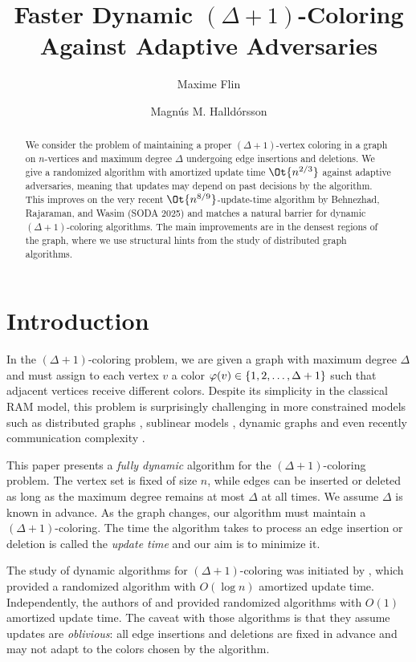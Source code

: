 \documentclass[a4paper,english,11pt]{amsart}
\title{Faster Dynamic $(\Delta+1)$-Coloring Against Adaptive Adversaries}
\author{Maxime Flin}
\author{Magnús M. Halldórsson}
\date{}
\theoremstyle{definition}
\DeclarePairedDelimiter{\set}{\{}{\}}
\newcommand{\col}{\varphi}
\begin{document}
\begin{abstract}
We consider the problem of maintaining a proper $(\Delta + 1)$-vertex coloring in a graph on $n$-vertices and maximum degree $\Delta$ undergoing edge insertions and deletions. We give a randomized algorithm with amortized update time $\Ot{ n^{2/3} }$ against adaptive adversaries, meaning that updates may depend on past decisions by the algorithm.
This improves on the very recent $\Ot{ n^{8/9} }$-update-time algorithm by Behnezhad, Rajaraman, and Wasim (SODA 2025) and 
matches a natural barrier for dynamic $(\Delta+1)$-coloring algorithms. 
The main improvements are in the densest regions of the graph, where we use structural hints from the study of distributed graph algorithms.

\end{abstract}
\maketitle

\section{Introduction}

In the $(\Delta+1)$-coloring problem, we are given a graph with maximum degree $\Delta$ and must assign to each vertex $v$ a color $\col(v) \in \set{1, 2, \ldots, \Delta+1}$ such that adjacent vertices receive different colors. Despite its simplicity in the classical RAM model, this problem is surprisingly challenging in more constrained models such as distributed graphs \cite{Linial92,BEPS16,HSS18,CLP20}, sublinear models \cite{ACK19,CFGUZ19,CDP21,AY25}, dynamic graphs \cite{BCHN18,HP22,BGKL22,BRW24} and even recently communication complexity \cite{FM24,CMNS24}.

This paper presents a \emph{fully dynamic} algorithm for the $(\Delta+1)$-coloring problem. 
The vertex set is fixed of size $n$, while edges can be inserted or deleted as long as the maximum degree remains at most $\Delta$ at all times.
We assume $\Delta$ is known in advance.
As the graph changes, our algorithm must maintain a $(\Delta+1)$-coloring. The time the algorithm takes to process an edge insertion or deletion is called the \emph{update time} and our aim is to minimize it.

The study of dynamic algorithms for $(\Delta+1)$-coloring was initiated by \cite{BCHN18}, which provided a randomized algorithm with $O(\log n)$ amortized update time. Independently, the authors of \cite{BGKL22} and \cite{HP22} provided randomized algorithms with $O(1)$ amortized update time. The caveat with those algorithms is that they assume updates are \emph{oblivious}: all edge insertions and deletions are fixed in advance and may not adapt to the colors chosen by the algorithm.
\end{document}
